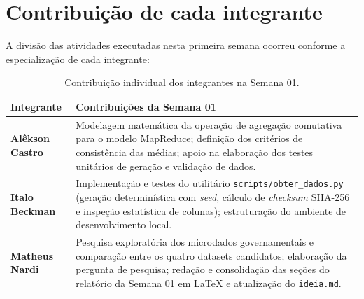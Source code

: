 \section{Contribuição de cada integrante}

A divisão das atividades executadas nesta primeira semana ocorreu conforme a
especialização de cada integrante:

\begin{table}[H]
  \centering
  \small
  \begin{tabularx}{\textwidth}{>{\raggedright}p{3.5cm}X}
    \toprule
    \textbf{Integrante} & \textbf{Contribuições da Semana 01} \\
    \midrule
    \textbf{Alêkson Castro} &
      Modelagem matemática da operação de agregação comutativa para o modelo
      MapReduce; definição dos critérios de consistência das médias; apoio na
      elaboração dos testes unitários de geração e validação de dados. \\
    \addlinespace
    \textbf{Italo Beckman} &
      Implementação e testes do utilitário \texttt{scripts/obter\_dados.py}
      (geração determinística com \emph{seed}, cálculo de \emph{checksum}
      SHA-256 e inspeção estatística de colunas); estruturação do ambiente de
      desenvolvimento local. \\
    \addlinespace
    \textbf{Matheus Nardi} &
      Pesquisa exploratória dos microdados governamentais e comparação entre os
      quatro datasets candidatos; elaboração da pergunta de pesquisa; redação e
      consolidação das seções do relatório da Semana 01 em LaTeX e atualização do
      \texttt{ideia.md}. \\
    \bottomrule
  \end{tabularx}
  \caption{Contribuição individual dos integrantes na Semana 01.}
\end{table}
